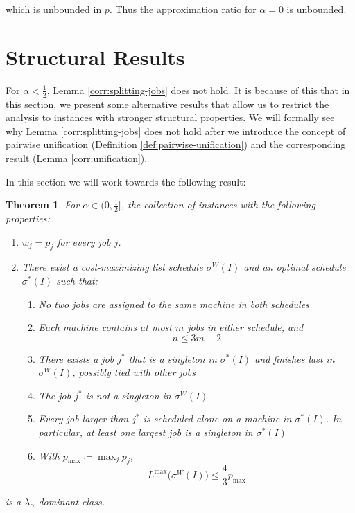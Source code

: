 \documentclass[%
english, titlepage=false %
]{./tum-templates/book/tumbook}
\newtheorem{theorem}{Theorem}
\begin{document}
which is unbounded in $p$. Thus the approximation ratio for $\alpha=0$ is unbounded.

\section{Structural Results}\label{sec:Struct-Results}
For $\alpha < \frac12$, Lemma \ref{corr:splitting-jobs} does not hold. 
It is because of this that in this section, we present some alternative results that allow us to restrict the analysis to instances
with stronger structural properties.
We will formally see why Lemma \ref{corr:splitting-jobs} does not hold after we introduce the concept of pairwise unification (Definition \ref{def:pairwise-unification}) and the corresponding
result (Lemma \ref{corr:unification}).

In this section we will work towards the following result:
\begin{theorem}\label{thm: secondframe}
For \(\alpha\in\Big(0,\frac12\Big]\), the collection of instances with the following properties:
\begin{enumerate}[label=(\roman*)]
    \item \(w_j=p_j\) for every job \(j\).

    \item There exist a cost-maximizing list schedule
      \(\sigma^{W}(I)\) and an optimal schedule
      \(\sigma^{*}(I)\) such that:
      \begin{enumerate}[label=(\alph*)]
          \item No two jobs are assigned to the same machine
                in both schedules

          \item Each machine contains at most \(m\) jobs
                in either schedule, and
                \[
                    n \leq 3m-2
                \]

          \item There exists a job \(j^*\) that is a singleton
                in \(\sigma^{*}(I)\) and finishes last
                in \(\sigma^{W}(I)\), possibly tied with
                other jobs

          \item The job \(j^*\) is not a singleton
                in \(\sigma^{W}(I)\)

          \item Every job larger than \(j^*\) is scheduled alone on a machine
                in \(\sigma^{*}(I)\). In particular, at least
                one largest job is a singleton in
                \(\sigma^{*}(I)\)

          \item With \(p_{\max}\coloneqq\max_j p_j\),
                \[
                    L^{\max}\bigl(\sigma^{W}(I)\bigr)
                    \leq \frac43 p_{\max}
                \]
      \end{enumerate}
\end{enumerate}

is a \(\lambda_\alpha\)-dominant class.
\end{theorem}
\end{document}
